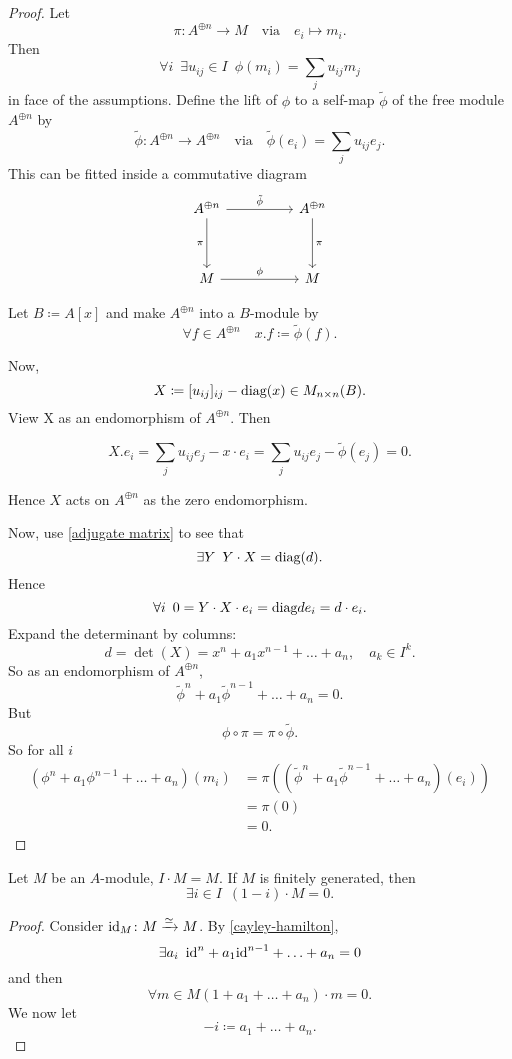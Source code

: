 \begin{proof}
  \label{cayley-hamilton}
  Let
  \[ \pi \colon A^{\oplus n} \to M \quad \text{via} \quad e_i \mapsto m_i. \]
  Then
  \[ \forall i \enspace \exists u_{ij} \in I \enspace \phi(m_i) = \sum_j u_{ij} m_j\]
  in face of the assumptions.
  Define the lift of $\phi$ to a self-map $\tilde{\phi}$ of the free module $A^{\oplus n}$ by
  \[ \tilde \phi \colon A^{\oplus n} \to A^{\oplus n} \quad \text{via} \quad \tilde \phi(e_i) = \sum_j u_{ij} e_j.\]
  This can be fitted inside a commutative diagram
  \begin{equation*}
    \begin{tikzcd}[row sep=huge, column sep=huge]
      A^{\oplus n} \arrow[swap]{d}{\pi} \arrow{r}{\tilde{\phi}}
      & A^{\oplus n} \arrow{d}{\pi} \\
      M \arrow{r}{\phi}
      & M
    \end{tikzcd}
  \end{equation*}

Let $B \coloneqq A[x]$ and make $A^{\oplus n}$ into a $B$-module by
\[ \forall f \in A^{\oplus n} \quad x . f \coloneqq \tilde{\phi}(f).\]

Now,
\[ X \coloneqq [u_{ij}]_{ij} - \text{diag}(x) \in M_{n \times n} (B).\]
View X as an endomorphism of $A^{\oplus n}$. Then

\[ X . e_i = \sum_j u_{ij} e_j - x \cdot e_i = \sum_j u_{ij} e_j - \tilde{\phi}(e_j) = 0.\]

Hence $X$ acts on $A^{\oplus n}$ as the zero endomorphism.

Now, use \cref{adjugate matrix} to see that
\[ \exists Y \enspace Y \cdot X = \text{diag}(d).\]
Hence
\[ \forall i \enspace 0 = Y \cdot X \cdot e_i = \text{diag}{d} e_i = d \cdot e_i.\]
Expand the determinant by columns:
\[ d = \det(X) = x^n + a_1 x^{n-1} + \dotsc + a_n, \quad a_k \in I^k.\]
So as an endomorphism of $A^{\oplus n}$,
\[\tilde{\phi}^n + a_1 \tilde{\phi}^{n-1} + \dotsc + a_n = 0.\]
But
\[ \phi \circ \pi = \pi \circ \tilde{\phi}.\]
So for all $i$
\begin{align*}
  (\phi^n + a_1 \phi^{n-1} + \dotsc + a_n)(m_i) & = \pi((\tilde{\phi}^n + a_1 \tilde{\phi}^{n-1} + \dotsc + a_n)(e_i)) \\
            & = \pi (0) \\
            & = 0.
\end{align*}
\end{proof}

\begin{lemma}[Nakayama]
  \label{nakayama}
  Let $M$ be an $A$-module, $I \cdot M = M$. If $M$ is finitely generated, then
  \[ \exists i \in I \enspace (1 - i) \cdot M = 0.\]
\end{lemma}
\begin{proof}
  Consider $\text{id}_M \colon M \xrightarrow{\simeq} M$.
  By \cref{cayley-hamilton},
  \[ \exists a_i \enspace \text{id}^n + a_1 \text{id}^{n-1} + \dotsc + a_n = 0\]
  and then
  \[ \forall m \in M (1 + a_1 + \dotsc + a_n) \cdot m = 0.\]
  We now let
  \[ -i \coloneqq a_1 + \dotsc + a_n.\]
\end{proof}


